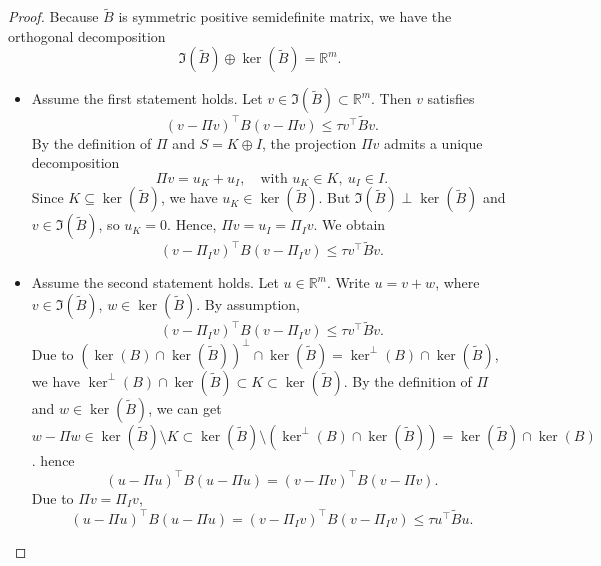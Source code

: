 \documentclass[10pt,a4paper]{amsart}
\begin{document}
\begin{proof}
    Because \(\tilde{B}\) is symmetric positive semidefinite matrix, we have the orthogonal decomposition
    \[\Im(\tilde B) \oplus \ker(\tilde B) =   \mathbb{R}^{m}.\]
    \begin{itemize}
        \item [\((\Rightarrow)\)] Assume the first statement holds.
        Let \( v \in \Im(\tilde B) \subset \mathbb{R}^{m} \). Then \( v \) satisfies
        \[
        (v - \Pi v)^\top B (v - \Pi v) \leq \tau v^\top \tilde B v.
        \]
       By the definition of \( \Pi \) and \( S = K \oplus I \), the projection \( \Pi v \) admits a unique decomposition
       \[
       \Pi v = u_K + u_I, \quad \text{with } u_K \in K,\ u_I \in I.
       \]
       Since \( K \subseteq \ker(\tilde B) \), we have \( u_K \in \ker(\tilde B) \). But \( \Im(\tilde B) \perp \ker(\tilde B) \) and $v \in \Im(\tilde B)$, so \( u_K = 0 \). Hence, \( \Pi v = u_I = \Pi_I v\). We obtain
       \[
       (v - \Pi_I v)^\top B (v - \Pi_I v) \leq \tau v^\top \tilde B v.
       \]  
        \item[\((\Leftarrow)\)] Assume the second statement holds. Let \( u \in \mathbb{R}^{m} \). Write \( u = v + w \), where \( v \in \Im(\tilde B) \), \( w \in \ker(\tilde B) \). By assumption,
        \[
        (v - \Pi_I v)^\top B (v - \Pi_I v) \leq \tau v^\top \tilde B v.
        \]
        Due to \((\ker(B)\cap \ker(\tilde B))^{\perp} \cap \ker(\tilde B) = \ker^{\perp}(B)\cap\ker(\tilde B)\), we have \(\ker^{\perp}(B)\cap\ker(\tilde B) \subset K \subset \ker(\tilde B)\). By the definition of \( \Pi \) and $w \in \ker(\tilde B)$, we can get \(w - \Pi w \in \ker(\tilde B) \setminus K \subset \ker(\tilde B) \setminus (\ker^{\perp}(B)\cap\ker(\tilde B)) = \ker(\tilde B) \cap \ker(B)\). hence
        \[
        (u - \Pi u)^\top B (u - \Pi u) = (v - \Pi v)^\top B (v - \Pi v).
        \]
        Due to \(\Pi v = \Pi_I v\), 
        \[
        (u - \Pi u)^\top B (u - \Pi u) = (v - \Pi_I v)^\top B (v - \Pi_I v) \leq \tau u^\top \tilde B u.
        \]
    \end{itemize}
\end{proof}
\end{document}
